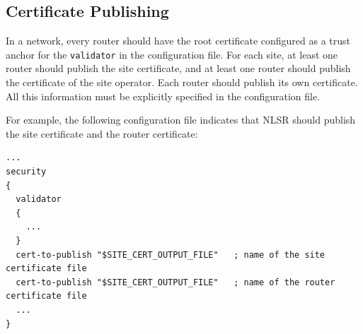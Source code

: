 \subsection{Certificate Publishing}

In a network, every router should have the root certificate configured as a trust anchor for the \texttt{validator} in the configuration file.
For each site, at least one router should publish the site certificate, and at least one router should publish the certificate of the site operator.
Each router should publish its own certificate.
All this information must be explicitly specified in the configuration file.

For example, the following configuration file indicates that NLSR should publish the site certificate and the router certificate:

\begin{verbatim}
...
security
{
  validator
  {
    ...
  }
  cert-to-publish "$SITE_CERT_OUTPUT_FILE"   ; name of the site certificate file
  cert-to-publish "$SITE_CERT_OUTPUT_FILE"   ; name of the router certificate file
  ...
}
\end{verbatim}